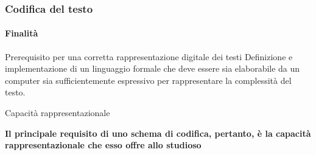 



\begin{frame}
	\frametitle{Codifica del testo}
	\framesubtitle{Finalità}
	\addtocounter{nframe}{1}

	\begin{block}{Prerequisito per una corretta rappresentazione digitale dei testi}
		Definizione e implementazione di un linguaggio formale che deve essere sia elaborabile da un computer sia sufficientemente espressivo per rappresentare la complessità del testo.
	\end{block}

	\begin{block}{Capacità rappresentazionale}
		\begin{center}
			\textbf{Il principale requisito di uno schema di codifica, pertanto, è la capacità rappresentazionale che esso offre allo studioso}
		\end{center}
	\end{block}

\end{frame}

